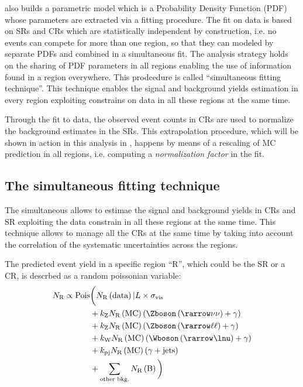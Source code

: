 \hf also builds a parametric model which is a Probability Density Function (PDF) whose parameters are extracted via a fitting procedure. The fit on data is based on SRs and CRs which are statistically independent by construction, i.e. no events can compete for more than one region, so that they can modeled by separate PDFs and combined in a simultaneous fit. The \hf analysis strategy holds on the sharing of PDF parameters in all regions enabling the use of information found in a region everywhere. This prodcedure is called ``simultaneous fitting technique''. This technique enables the signal and background yields estimation in every region exploiting constrains on data in all these regions at the same time.

Through the fit to data, the observed event counts in CRs are used to normalize the background estimates in the SRs. This extrapolation procedure, which will be shown in action in this analysis in \Fig{\ref{fig:regions}}, happens by means of a rescaling of MC prediction in all regions, i.e. computing a \emph{normalization factor} in the fit.

\subsection{The simultaneous fitting technique}

The simultaneous allows to estimae the signal and background yields in CRs and SR exploiting the data constrain in all these regions at the same time. This technique allows to manage all the CRs at the same time by taking into account the correlation of the systematic uncertainties across the regions.

The predicted event yield in a specific region ``R'', which could be the SR or a CR, is descrbed as a random poissonian variable:
\begin{equation}
\begin{split}
		N_\textup{R} \propto \text{Pois} &\bigg( N_\textup{R}\left(\text{data}\right)\vert L\times\sigma_{\textup{vis}} \\
						&+ k_{\textup{Z}} N_{\textup{R}}\left(\text{MC}\right) \left(\Zboson \left(\rarrow \nu\nu \right) +  \gamma\right) \\
						&+ k_{\textup{Z}}N_\textup{R}\left(\text{MC}\right) \left(\Zboson \left(\rarrow \ell\ell\right) + \gamma \right) \\
						&+ k_{\textup{W}}N_\textup{R}\left(\text{MC}\right) \left(\Wboson \left(\rarrow \lnu\right)+ \gamma \right) \\
					 	&+ k_{\textup{pj}}N_{\textup{R}}\left(\text{MC}\right) \left(\gamma + \text{jets} \right)\\  
					 	&+ \sum_{\textup{other bkg.}} N_{\textup{R}}\left(\text{B}\right) \bigg)
\end{split}
\label{eqn:nr}
\end{equation}

